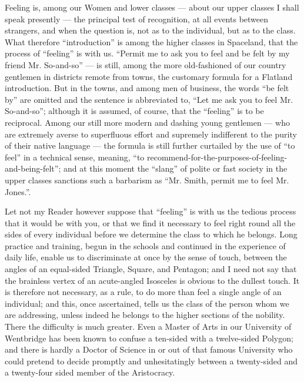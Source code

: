 \documentclass[12pt, a4paper, oneside]{memoir}
\begin{document}
Feeling is, among our Women and lower classes --- about our upper classes I
shall speak presently --- the principal test of recognition, at all events
between strangers, and when the question is, not as to the individual, but as
to the class. What therefore ``introduction'' is among the higher classes in
Spaceland, that the process of ``feeling'' is with us. ``Permit me to ask you to
feel and be felt by my friend Mr. So-and-so'' --- is still, among the more
old-fashioned of our country gentlemen in districts remote from towns, the
customary formula for a Flatland introduction. But in the towns, and among men
of business, the words ``be felt by'' are omitted and the sentence is
abbreviated to, ``Let me ask you to feel Mr. So-and-so''; although it is
assumed, of course, that the ``feeling'' is to be reciprocal. Among our still
more modern and dashing young gentlemen --- who are extremely averse to
superfluous effort and supremely indifferent to the purity of their native
language --- the formula is still further curtailed by the use of ``to feel'' in a
technical sense, meaning, ``to
recommend-for-the-purposes-of-feeling-and-being-felt''; and at this moment the
``slang'' of polite or fast society in the upper classes sanctions such a
barbarism as ``Mr. Smith, permit me to feel Mr. Jones.''.

Let not my Reader however suppose that ``feeling'' is with us the tedious
process that it would be with you, or that we find it necessary to feel right
round all the sides of every individual before we determine the class to which
he belongs. Long practice and training, begun in the schools and continued in
the experience of daily life, enable us to discriminate at once by the sense
of touch, between the angles of an equal-sided Triangle, Square, and Pentagon;
and I need not say that the brainless vertex of an acute-angled Isosceles is
obvious to the dullest touch. It is therefore not necessary, as a rule, to do
more than feel a single angle of an individual; and this, once ascertained,
tells us the class of the person whom we are addressing, unless indeed he
belongs to the higher sections of the nobility. There the difficulty is much
greater. Even a Master of Arts in our University of Wentbridge has been known
to confuse a ten-sided with a twelve-sided Polygon; and there is hardly a
Doctor of Science in or out of that famous University who could pretend to
decide promptly and unhesitatingly between a twenty-sided and a twenty-four
sided member of the Aristocracy.
\end{document}
